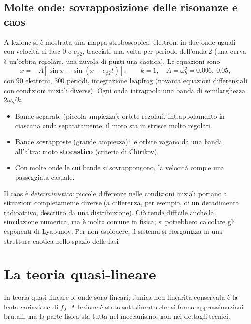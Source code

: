 \subsection{Molte onde: sovrapposizione delle risonanze e caos}
A lezione si è mostrata una mappa stroboscopica: elettroni in due onde uguali con velocità di fase $0$ e $v_{\phi2}$, tracciati una volta per periodo dell'onda 2 (una curva è un'orbita regolare, una nuvola di punti una caotica). Le equazioni sono
\begin{equation}
\ddot x=-A\left[\sin x+\sin(x-v_{\phi2}t)\right],\qquad k=1,\quad A=\omega_b^2=0.006,\ 0.05,
\end{equation}
con $90$ elettroni, $300$ periodi, integrazione leapfrog (novanta equazioni differenziali con condizioni iniziali diverse). Ogni onda intrappola una banda di semilarghezza $2\omega_b/k$.
\begin{itemize}
\item Bande separate (piccola ampiezza): orbite regolari, intrappolamento in ciascuna onda separatamente; il moto sta in strisce molto regolari.
\item Bande sovrapposte (grande ampiezza): le orbite vagano da una banda all'altra: moto \textbf{stocastico} (criterio di Chirikov).
\item Con molte onde le cui bande si sovrappongono, la velocità compie una passeggiata casuale.
\end{itemize}
Il caos è \emph{deterministico}: piccole differenze nelle condizioni iniziali portano a situazioni completamente diverse (a differenza, per esempio, di un decadimento radioattivo, descritto da una distribuzione). Ciò rende difficile anche la simulazione numerica, ma è molto comune in fisica; si potrebbero calcolare gli esponenti di Lyapunov. Per non esplodere, il sistema si riorganizza in una struttura caotica nello spazio delle fasi.

\section{La teoria quasi-lineare}
In teoria quasi-lineare le onde sono lineari; l'unica non linearità conservata è la lenta variazione di $f_0$. A lezione è stato sottolineato che si fanno approssimazioni brutali, ma la parte fisica sta tutta nel meccanismo, non nei dettagli tecnici.

